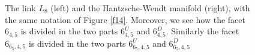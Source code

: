 \documentclass{amsart}
\theoremstyle{definition}
\theoremstyle{remark}
\begin{document}
\begin{figure}

    \caption{The link $L_8$ (left) and the Hantzsche-Wendt manifold (right), with the same notation of Figure \ref{f14}. Moreover, we see how the facet $6_{4,5}$ is divided in the two parts $6_{4,5}^U$ and $6_{4,5}^D$. Similarly the facet $6_{6_5,4,5}$ is divided in the two parts $6_{6_5,4,5}^U$ and $6_{6_5,4,5}^D$}\label{f16}
\end{figure}
\end{document}

